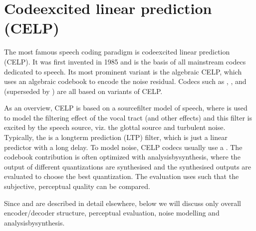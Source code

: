 \documentclass[letterpaper,10pt,english]{jupyterBook}
\begin{document}
\sphinxstepscope


\section{Code\sphinxhyphen{}excited linear prediction (CELP)}
\label{\detokenize{Transmission/Code-excited_linear_prediction_CELP:code-excited-linear-prediction-celp}}\label{\detokenize{Transmission/Code-excited_linear_prediction_CELP::doc}}
\sphinxAtStartPar
The most famous speech coding paradigm is code\sphinxhyphen{}excited linear prediction
(CELP). It was first invented in 1985 and is the basis of all
main\sphinxhyphen{}stream codecs dedicated to speech. Its most prominent variant is
the algebraic CELP, which uses an algebraic codebook to encode the noise
residual. Codecs such as
,
,
 and
 (superseded by
) are all based
on variants of CELP.

\sphinxAtStartPar
As an overview, CELP is based on a source\sphinxhyphen{}filter model of speech, where
 is used to model the filtering
effect of the vocal tract (and other effects) and this filter is excited
by the speech source, viz. the glottal source and turbulent noise.
Typically, the  is a long\sphinxhyphen{}term prediction (LTP)
filter, which is just a linear predictor with a long delay. To model
noise, CELP codecs usually use a . The codebook contribution is often
optimized with analysis\sphinxhyphen{}by\sphinxhyphen{}synthesis, where the output of different
quantizations are synthesised and the synthesised outputs are evaluated
to choose the best quantization. The evaluation uses {\hyperref[\detokenize{Transmission/Perceptual_modelling_in_speech_and_audio_coding::doc}]{}} such that
the subjective, perceptual quality can be compared.

\sphinxAtStartPar
Since  and  are described in detail elsewhere,
below we will discuss only overall encoder/decoder structure, perceptual
evaluation, noise modelling and analysis\sphinxhyphen{}by\sphinxhyphen{}synthesis.
\end{document}
